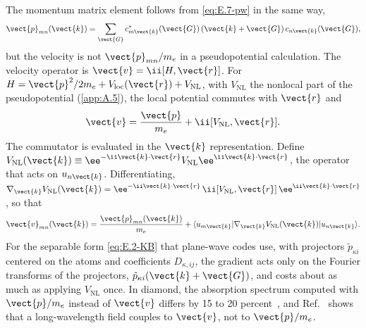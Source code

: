 The momentum matrix element follows from \cref{eq:E.7-pw} in the same way,
\begin{equation}
  \vect{p}_{mn}(\vect{k}) = \sum_{\vect{G}} c^*_{m\vect{k}}(\vect{G})\,(\vect{k} + \vect{G})\,c_{n\vect{k}}(\vect{G}) ,
  \label{eq:E.7-ppw}
\end{equation}
but the velocity is not $\vect{p}_{mn}/m_e$ in a pseudopotential calculation. The velocity operator is $\vect{v} = \ii[H,\vect{r}]$. For $H = \vect{p}^2/2m_e + V_{\mathrm{loc}}(\vect{r}) + V_{\mathrm{NL}}$, with $V_{\mathrm{NL}}$ the nonlocal part of the pseudopotential (\cref{app:A.5}), the local potential commutes with $\vect{r}$ and
\begin{equation}
  \vect{v} = \frac{\vect{p}}{m_e} + \ii[V_{\mathrm{NL}},\vect{r}] .
  \label{eq:E.7-v}
\end{equation}
The commutator is evaluated in the $\vect{k}$ representation. Define $V_{\mathrm{NL}}(\vect{k}) \equiv \ee^{-\ii\vect{k}\cdot\vect{r}}V_{\mathrm{NL}}\ee^{\ii\vect{k}\cdot\vect{r}}$, the operator that acts on $u_{n\vect{k}}$. Differentiating, $\nabla_{\vect{k}}V_{\mathrm{NL}}(\vect{k}) = \ee^{-\ii\vect{k}\cdot\vect{r}}\,\ii[V_{\mathrm{NL}},\vect{r}]\,\ee^{\ii\vect{k}\cdot\vect{r}}$, so that
\begin{equation}
  \vect{v}_{mn}(\vect{k}) = \frac{\vect{p}_{mn}(\vect{k})}{m_e} + \langle u_{m\vect{k}}|\nabla_{\vect{k}}V_{\mathrm{NL}}(\vect{k})|u_{n\vect{k}}\rangle .
  \label{eq:E.7-vNL}
\end{equation}
For the separable form \cref{eq:E.2-KB} that plane-wave codes use, with projectors $\tilde p_{\kappa i}$ centered on the atoms and coefficients $D_{\kappa,ij}$, the gradient acts only on the Fourier transforms of the projectors, $\tilde p_{\kappa i}(\vect{k}+\vect{G})$, and costs about as much as applying $V_{\mathrm{NL}}$ once. In diamond, the absorption spectrum computed with $\vect{p}/m_e$ instead of $\vect{v}$ differs by 15 to 20 percent~\cite[Fig.~1]{ismailbeigi2001coupling}, and Ref.~\cite[Eq.~(20)]{ismailbeigi2001coupling} shows that a long-wavelength field couples to $\vect{v}$, not to $\vect{p}/m_e$.

